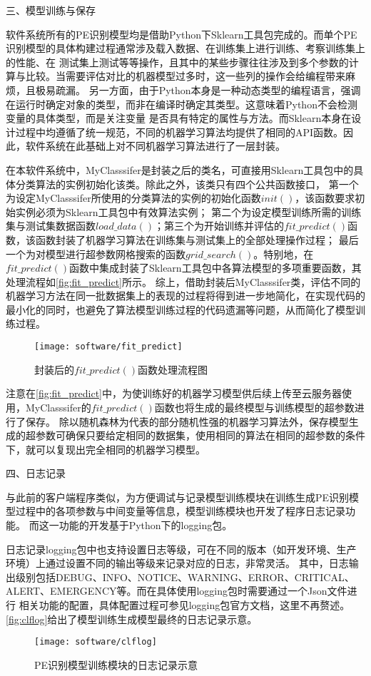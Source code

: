 三、模型训练与保存

软件系统所有的PE识别模型均是借助Python下Sklearn工具包完成的。而单个PE识别模型的具体构建过程通常涉及载入数据、在训练集上进行训练、考察训练集上的性能、在
测试集上测试等等操作，且其中的某些步骤往往涉及到多个参数的计算与比较。当需要评估对比的机器模型过多时，这一些列的操作会给编程带来麻烦，且极易疏漏。
另一方面，由于Python本身是一种动态类型的编程语言，强调在运行时确定对象的类型，而非在编译时确定其类型。这意味着Python不会检测变量的具体类型，而是关注变量
是否具有特定的属性与方法。而Sklearn本身在设计过程中均遵循了统一规范，不同的机器学习算法均提供了相同的API函数。因此，软件系统在此基础上对不同机器学习算法进行了一层封装。

在本软件系统中，MyClasssifer是封装之后的类名，可直接用Sklearn工具包中的具体分类算法的实例初始化该类。除此之外，该类只有四个公共函数接口，
第一个为设定MyClasssifer所使用的分类算法的实例的初始化函数$init()$，该函数要求初始实例必须为Sklearn工具包中有效算法实例；
第二个为设定模型训练所需的训练集与测试集数据函数$load\_data()$；第三个为开始训练并评估的$fit\_predict()$函数，该函数封装了机器学习算法在训练集与测试集上的全部处理操作过程；
最后一个为对模型进行超参数网格搜索的函数$grid\_search()$。特别地，在$fit\_predict()$函数中集成封装了Sklearn工具包中各算法模型的多项重要函数，其处理流程如\autoref{fig:fit_predict}所示。
综上，借助封装后MyClasssifer类，评估不同的机器学习方法在同一批数据集上的表现的过程将得到进一步地简化，在实现代码的最小化的同时，也避免了算法模型训练过程的代码遗漏等问题，从而简化了模型训练过程。

\begin{figure}[h]
    \centering
    \texttt{[image: software/fit\_predict]}
    \caption{\label{fig:fit_predict}封装后的$fit\_predict()$函数处理流程图}
\end{figure}

注意在\autoref{fig:fit_predict}中，为使训练好的机器学习模型供后续上传至云服务器使用，MyClasssifer的$fit\_predict()$函数也将生成的最终模型与训练模型的超参数进行了保存。
除以随机森林为代表的部分随机性强的机器学习算法外，保存模型生成的超参数可确保只要给定相同的数据集，使用相同的算法在相同的超参数的条件下，就可以复现出完全相同的机器学习模型。

四、日志记录

与此前的客户端程序类似，为方便调试与记录模型训练模块在训练生成PE识别模型过程中的各项参数与中间变量等信息，模型训练模块也开发了程序日志记录功能。
而这一功能的开发基于Python下的logging包。

日志记录logging包中也支持设置日志等级，可在不同的版本（如开发环境、生产环境）上通过设置不同的输出等级来记录对应的日志，非常灵活。
其中，日志输出级别包括DEBUG、INFO、NOTICE、WARNING、ERROR、CRITICAL、ALERT、EMERGENCY等。而在具体使用logging包时需要通过一个Json文件进行
相关功能的配置，具体配置过程可参见logging包官方文档，这里不再赘述。\autoref{fig:clflog}给出了模型训练生成模型最终的日志记录示意。
\begin{figure}[htbp]
    \centering
    \texttt{[image: software/clflog]}
    \caption{\label{fig:clflog}PE识别模型训练模块的日志记录示意}
\end{figure}

